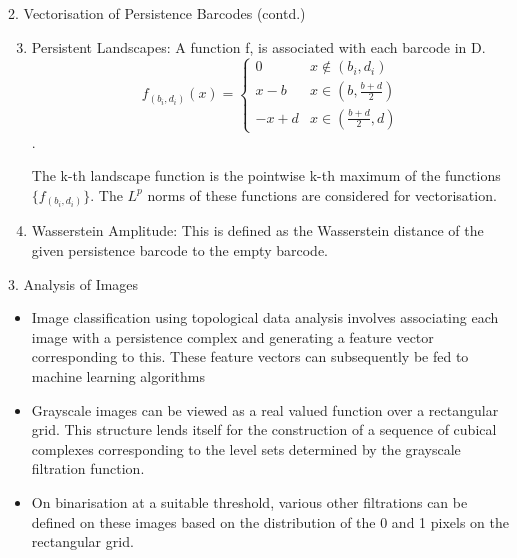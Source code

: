 \documentclass{beamer}
\begin{document}
\begin{frame}{2. Vectorisation of Persistence Barcodes (contd.)}
\begin{enumerate}
\setcounter{enumi}{2}
\item Persistent Landscapes: A function f, is associated with each barcode in D.
\begin{equation}
f_{(b_i,d_i)}(x) = \begin{cases}
 0 & x \notin (b_i,d_i) \\
 x- b   & x \in (b, \frac{b+d}{2})\\
 -x + d & x \in (\frac{b+d}{2} , d)
\end{cases}
\end{equation}. 

The k-th landscape function is the pointwise k-th maximum of the functions $\{f_{(b_i,d_i)}\}$. The $L^p$ norms of these functions are considered for vectorisation.
\item Wasserstein Amplitude: This is defined as the Wasserstein distance of the given persistence barcode to the empty barcode.
\end{enumerate}
\end{frame}


\begin{frame}{3. Analysis of Images}

\begin{center}
\begin{itemize}
\item Image classification using topological data analysis involves associating each image with a persistence complex and generating a feature vector corresponding to this. These feature vectors can subsequently be fed to machine learning algorithms
\item Grayscale images can be viewed as a real valued function over a rectangular grid. This structure lends itself for the construction of a sequence of cubical complexes corresponding to the level sets determined by the grayscale filtration function.
\item On binarisation at a suitable threshold, various other filtrations can be defined on these images based on the distribution of the 0 and 1 pixels on the rectangular grid. 

\end{itemize}
\end{center}
\end{frame}
\end{document}
